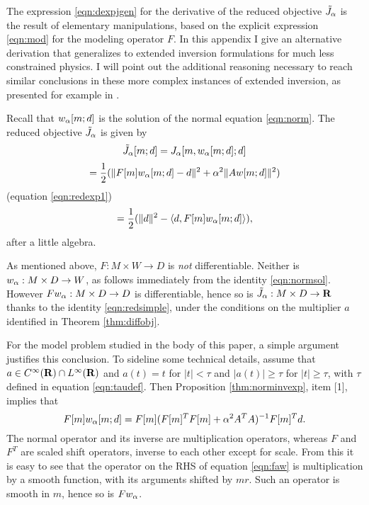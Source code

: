 The expression \ref{eqn:dexpjgen} for the derivative of the reduced
objective $\tilde{J}_{\alpha}$ is the result of elementary manipulations, based on the
explicit expression \ref{eqn:mod} for the modeling operator $F$. In
this appendix I give an alternative derivation that generalizes to
extended inversion formulations for much less constrained physics. I
will point out the additional reasoning necessary to reach similar
conclusions in these more complex instances of extended inversion, as
presented for example in \cite{StolkSymes:03,StolkDeHoopSymes:09,Symes:IPTA14,tenKroode:IPTA14,HuangSymes:Geo17,HuangSymes:Geo18a,HuangSymes:Geo18b,HuangNammourSymesDollizal:SEG19}.

Recall that $w_{\alpha}[m;d]$ is the solution of the normal equation
\ref{eqn:norm}. The reduced objective $\tilde{J}_{\alpha}$ is given by
\[
  \tilde{J}_{\alpha}[m;d] = J_{\alpha}[m,w_{\alpha}[m;d];d]
\]
\[
  = \frac{1}{2}(\|F[m]w_{\alpha}[m;d]-d\|^2 + \alpha^2\|Aw[m;d]\|^2)
\]
(equation \ref{eqn:redexp1})
\begin{equation}
  \label{eqn:redsimple}
  =\frac{1}{2}(\|d\|^2 - \langle d,F[m]w_{\alpha}[m;d]\rangle),
\end{equation}
after a little algebra.

As mentioned above, $F:M \times W \rightarrow D$ is {\em not}
differentiable. Neither is $w_{\alpha}: M \times D \rightarrow W$, as follows
immediately from the identity \ref{eqn:normsol}. However $Fw_{\alpha}: M
\times D \rightarrow D$ is differentiable, hence so is $\tilde{J}_{\alpha}: M \times
D \rightarrow {\bf R}$ thanks
to the identity \ref{eqn:redsimple},
under the conditions on the multiplier $a$ identified in Theorem
\ref{thm:diffobj}.

For the model problem studied in the body of this paper, a simple
argument justifies this conclusion.  To sideline some technical
details, assume that
$a \in C^{\infty}({\bf R})\cap L^{\infty}({\bf R})$ and $a(t)=t$ for $|t|<\tau$ and $|a(t)| \ge
\tau$ for $|t| \ge \tau$, with $\tau$
defined in equation \ref{eqn:taudef}. Then
Proposition \ref{thm:norminvexp}, item [1], implies that
\begin{equation}
  \label{eqn:faw}
  F[m]w_{\alpha}[m;d] = F[m](F[m]^TF[m] + \alpha^2 A^TA)^{-1}F[m]^T d.
\end{equation}
The normal operator and its inverse are multiplication
operators, whereas $F$ and $F^T$ are scaled shift operators, inverse
to each other except for scale. From this it is easy to see that the
operator on the RHS of equation \ref{eqn:faw} is multiplication by a
smooth function, with its arguments shifted by $mr$. Such an operator
is smooth in $m$, hence so is $Fw_{\alpha}$.

